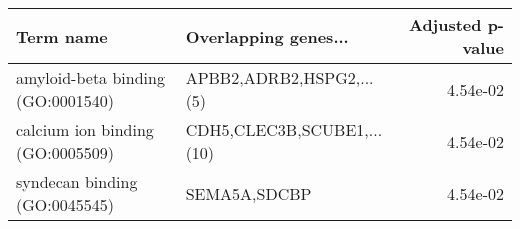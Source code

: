 \begin{tabular}{llr}
\toprule
                        Term name &       Overlapping genes... &  Adjusted p-value \\
\midrule
amyloid-beta binding (GO:0001540) &   APBB2,ADRB2,HSPG2,...(5) &          4.54e-02 \\
 calcium ion binding (GO:0005509) & CDH5,CLEC3B,SCUBE1,...(10) &          4.54e-02 \\
    syndecan binding (GO:0045545) &               SEMA5A,SDCBP &          4.54e-02 \\
\bottomrule
\end{tabular}
